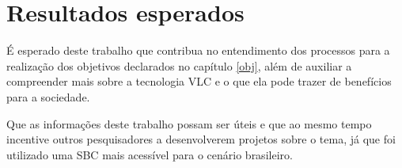 \section{Resultados esperados}

É esperado deste trabalho que contribua no entendimento dos processos para a realização dos objetivos declarados no capítulo \ref{obj}, além de auxiliar a compreender mais sobre a tecnologia VLC e o que ela pode trazer de benefícios para a sociedade.

Que as informações deste trabalho possam ser úteis e que ao mesmo tempo incentive outros pesquisadores a desenvolverem projetos sobre o tema, já que foi utilizado uma SBC mais acessível para o cenário brasileiro.

